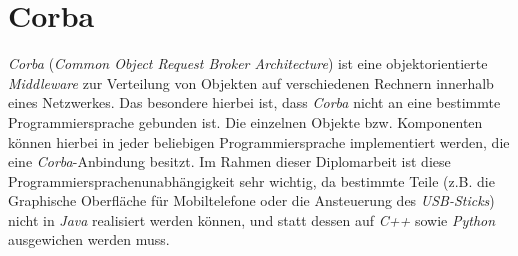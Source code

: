 \section{Corba}
    \emph{Corba} (\emph{Common Object Request Broker Architecture}) ist eine objektorientierte \emph{Middleware} 
    zur Verteilung von Objekten auf verschiedenen Rechnern innerhalb eines Netzwerkes. Das besondere hierbei ist, 
    dass \emph{Corba} nicht an eine bestimmte Programmiersprache gebunden ist. Die einzelnen Objekte bzw. Komponenten 
    können hierbei in jeder beliebigen Programmiersprache implementiert werden, die eine \emph{Corba}-Anbindung besitzt.
    Im Rahmen dieser Diplomarbeit ist diese Programmiersprachenunabhängigkeit sehr wichtig, da bestimmte
    Teile (z.B. die Graphische Oberfläche für Mobiltelefone oder die Ansteuerung des \emph{USB-Sticks}) nicht in 
    \emph{Java} realisiert werden können, und statt dessen auf \emph{C++} sowie \emph{Python} ausgewichen werden muss.
